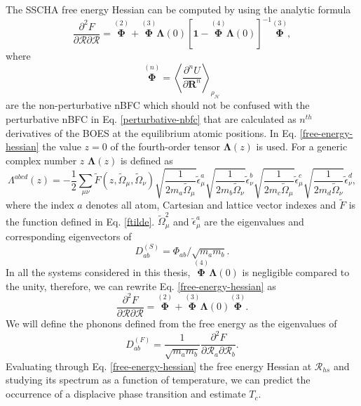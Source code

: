 The SSCHA free energy Hessian can be computed by using the analytic formula\cite{bianco2017second}
\begin{equation}
 \label{free-energy-hessian}
 \frac{\partial^{2}F}{\partial\boldsymbol{\mathcal{R}}\partial\boldsymbol{\mathcal{R}}}=\overset{(2)}{\boldsymbol{\Phi}}+\overset{(3)}{\boldsymbol{\Phi}}\boldsymbol{\Lambda}(0)[\mathbf{1}-\overset{(4)}{\boldsymbol{
\Phi}}\boldsymbol{\Lambda}(0)]^{-1}\overset{(3)}{\boldsymbol{\Phi}},
\end{equation}
where 
\begin{equation}
 \overset{(n)}{\boldsymbol{\Phi}}=\left\langle\frac{\partial^{n}U}{\partial\mathbf{R}^{n}}\right\rangle_{\rho_{\mathcal{H}}}
\end{equation}
are the non-perturbative nBFC which should not be confused with the perturbative nBFC in Eq. \ref{perturbative-nbfc} that are calculated as $n^{th}$ derivatives of the BOES at the equilibrium atomic positions. In
Eq. \ref{free-energy-hessian} the value $z=0$ of the fourth-order tensor $\boldsymbol{\Lambda}(z)$ is used. For a generic complex number $z$ $\boldsymbol{\Lambda}(z)$ is defined as
\begin{equation}
 \Lambda^{abcd}(z)=-\frac{1}{2}\sum_{\mu\nu}\tilde{F}(z,\tilde{\Omega}_{\mu},\tilde{\Omega}_{\nu})\sqrt{\frac{1}{2m_{a}\tilde{\Omega}_{\mu}}}\tilde{\epsilon}_{\mu}^{a}\sqrt{\frac{1}{2m_{b}\tilde{\Omega}_{\nu}}}\tilde{
 \epsilon}_{\nu}^{b}\sqrt{\frac{1}{2m_{c}\tilde{\Omega}_{\mu}}}\tilde{\epsilon}_{\mu}^{c}\sqrt{\frac{1}{2m_{d}\tilde{\Omega}_{\nu}}}\tilde{\epsilon}_{\nu}^{d},
\end{equation}
where the index $a$ denotes all atom, Cartesian and lattice vector indexes and $\tilde{F}$ is the function defined in Eq. \ref{ftilde}. $\tilde{\Omega}_{\mu}^{2}$ and $\tilde{\epsilon}_{\mu}^{a}$ are the eigenvalues 
and corresponding eigenvectors of
\begin{equation}
 D_{ab}^{(S)}=\Phi_{ab}/\sqrt{m_{a}m_{b}}.
\end{equation}
In all the systems considered in this thesis, $\overset{(4)}{\boldsymbol{\Phi}}\boldsymbol{\Lambda}(0)$ is negligible compared to the unity, therefore, we can rewrite Eq. \ref{free-energy-hessian} as
\begin{equation}
 \frac{\partial^{2}F}{\partial\boldsymbol{\mathcal{R}}\partial\boldsymbol{\mathcal{R}}}=\overset{(2)}{\boldsymbol{\Phi}}+\overset{(3)}{\boldsymbol{\Phi}}\boldsymbol{\Lambda}(0)\overset{(3)}{\boldsymbol{\Phi}}.
\end{equation}
We will define the phonons defined from the free energy as the eigenvalues of
\begin{equation}
 \label{free-energy-dynamical-matrix}
 D_{ab}^{(F)}=\frac{1}{\sqrt{m_{a}m_{b}}}\frac{\partial^{2}F}{\partial\mathcal{R}_{a}\partial\mathcal{R}_{b}}.
\end{equation} 
Evaluating through Eq. \ref{free-energy-hessian} the free energy Hessian at $\boldsymbol{\mathcal{R}}_{hs}$ and studying its spectrum as a function of temperature, we can predict the occurrence of a displacive phase transition 
and estimate $T_{c}$. 

